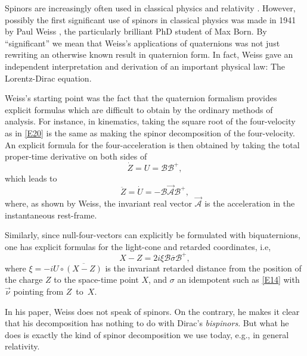 \documentclass [12pt,a4paper      ]{article}
\newcommand{\CON}{\overline}          %
\newcommand{\scal}{\circ}             %
\begin{document}
     Spinors are increasingly often used in classical physics and 
relativity \cite{R23}.   However, possibly the first significant use of 
spinors in classical physics was made in 1941 by Paul Weiss \cite{R24}, the 
particularly brilliant PhD student of Max Born.  By ``significant'' 
we  mean that Weiss's applications of quaternions was not just  
rewriting an otherwise known result in quaternion form.   In fact, 
Weiss gave an independent interpretation  and  derivation  of  an 
important physical law:  The Lorentz-Dirac equation.

     Weiss's starting  point  was the fact  that  the  quaternion 
formalism  provides  explicit  formulas which  are  difficult  to 
obtain  by the ordinary methods of analysis.   For  instance,  in 
kinematics,  taking the square root of the four-velocity as in  \eqref{E20} 
is the same as making the spinor decomposition of the four-velocity. 
An  explicit  formula for the four-acceleration is then obtained  by 
taking the total proper-time derivative on both sides of
%
\begin{equation}\label{E35A} 
         \dot{Z} = U = \mathcal{B} \mathcal{B}^+,     %
\end{equation}
%
which leads to
%
\begin{equation}\label{E35B} 
         \ddot{Z} = \dot{U} = - \mathcal{B} \vec{\mathcal{A}} \mathcal{B}^+,     %
\end{equation}
%
where, as shown by Weiss, the invariant real vector $\vec{\mathcal{A}}$
 is the acceleration in the instantaneous  rest-frame.


   Similarly,  since null-four-vectors can explicitly  be formulated with biquaternions,  
one has explicit formulas for the light-cone and retarded coordinates, i.e,
%
\begin{equation}\label{E36}
     X-Z = 2i \xi \mathcal{B} \CON{\sigma} \mathcal{B}^+,       %
\end{equation}
%
where $\xi=-iU\scal\CON{(X-Z)}$ is the invariant retarded distance from the position of the charge $Z$ to the space-time point $X$, and $\sigma$ an idempotent such as \eqref{E14} with $\vec{\nu}$ pointing from $Z$~to~$X$.

      In  his  paper,  Weiss does not speak of  spinors.  On  the 
contrary, he makes it clear that his decomposition has nothing to 
do  with Dirac's \emph{bispinors}.  But what he does is exactly the kind 
of spinor decomposition we use today, e.g., in general relativity.
\end{document}
